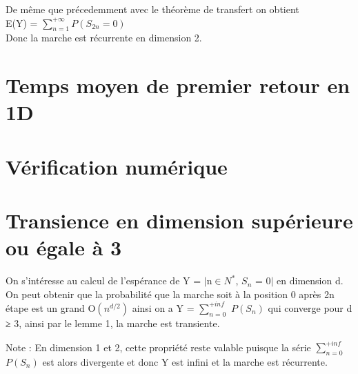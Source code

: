 \documentclass{article}
\theoremstyle{definition}
\begin{document}
De même que précedemment avec le théorème de transfert on obtient \\
E(Y) = $\sum_{n=1}^{+\infty} P(S_{2n} = 0)$ \\
Donc la marche est récurrente en dimension 2.

\section{Temps moyen de premier retour en 1D}

\section{Vérification numérique}

\section{Transience en dimension supérieure ou égale à 3}

On s'intéresse au calcul de l'espérance de Y = $|$n$\in {N}^{*}$, $S_{n}$ = 0$|$ en dimension d.
On peut obtenir que la probabilité que la marche soit à la position 0 après 2n étape est un grand O$(n^{d/2})$ ainsi on a 
Y = $\sum_{n=0}^{+inf}$ $P(S_{n})$ qui converge pour d ≥ 3, ainsi par le lemme 1, la marche est transiente.

Note : En dimension 1 et 2, cette propriété reste valable puisque la série $\sum_{n=0}^{+inf}$ $P(S_{n})$ est alors divergente et donc Y est infini et la marche est récurrente.
\end{document}
